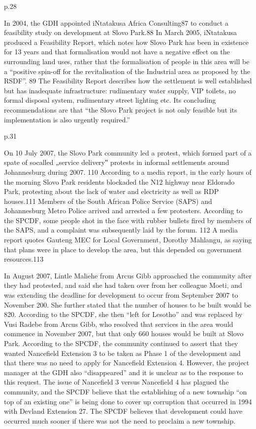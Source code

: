 \documentclass[12pt]{article}
\begin{document}
p.28

In 2004, the GDH appointed iNtatakusa Africa Consulting87 to conduct a feasibility study on
development at Slovo Park.88 In March 2005, iNtatakusa produced a Feasibility Report, which
notes how Slovo Park has been in existence for 13 years and that formalisation would not
have a negative effect on the surrounding land uses, rather that the formalisation of people
in this area will be a “positive spin-off for the revitalisation of the Industrial area as proposed
by the RSDF”.
89 The Feasibility Report describes how the settlement is well established but has
inadequate infrastructure: rudimentary water supply, VIP toilets, no formal disposal system,
rudimentary street lighting etc. Its concluding recommendations are that “the Slovo Park
project is not only feasible but its implementation is also urgently required.”

p.31

On 10 July 2007, the Slovo Park community led a protest, which formed part of a spate of socalled „service delivery‟ protests in informal settlements around Johannesburg during 2007.
110
According to a media report, in the early hours of the morning Slovo Park residents
blockaded the N12 highway near Eldorado Park, protesting about the lack of water and
electricity as well as RDP houses.111 Members of the South African Police Service (SAPS) and
Johannesburg Metro Police arrived and arrested a few protesters. According to the SPCDF,
some people shot in the face with rubber bullets fired by members of the SAPS, and a
complaint was subsequently laid by the forum.
112 A media report quotes Gauteng MEC for
Local Government, Dorothy Mahlangu, as saying that plans were in place to develop the
area, but this depended on government resources.113

In August 2007, Lintle Maliehe from Arcus Gibb approached the community after they had
protested, and said she had taken over from her colleague Moeti, and was extending the
deadline for development to occur from September 2007 to November 200. She further
stated that the number of houses to be built would be 820. According to the SPCDF, she then
“left for Lesotho” and was replaced by Vusi Radebe from Arcus Gibb, who resolved that
services in the area would commence in November 2007, but that only 660 houses would be
built at Slovo Park. According to the SPCDF, the community continued to assert that they
wanted Nancefield Extension 3 to be taken as Phase 1 of the development and that there
was no need to apply for Nancefield Extension 4. However, the project manager at the GDH
also “disappeared” and it is unclear as to the response to this request. The issue of Nancefield
3 versus Nancefield 4 has plagued the community, and the SPCDF believe that the
establishing of a new township “on top of an existing one” is being done to cover up
corruption that occurred in 1994 with Devland Extension 27. The SPCDF believes that
development could have occurred much sooner if there was not the need to proclaim a
new township. 
\end{document}
